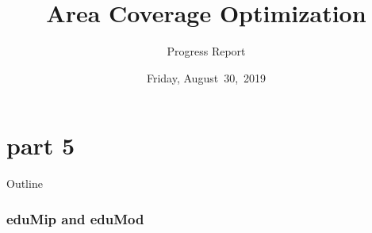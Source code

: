 \documentclass{beamer}
\begin{document}
\part{part 5}
\title{Area Coverage Optimization}
\subtitle{Progress Report}
\date[July~19,~2019]{Friday, August~30,~2019}
\begin{frame}
\maketitle
\end{frame}
\begin{frame}{Outline}
  \tableofcontents
  \end{frame}
\section{eduMip and eduMod}
\end{document}
